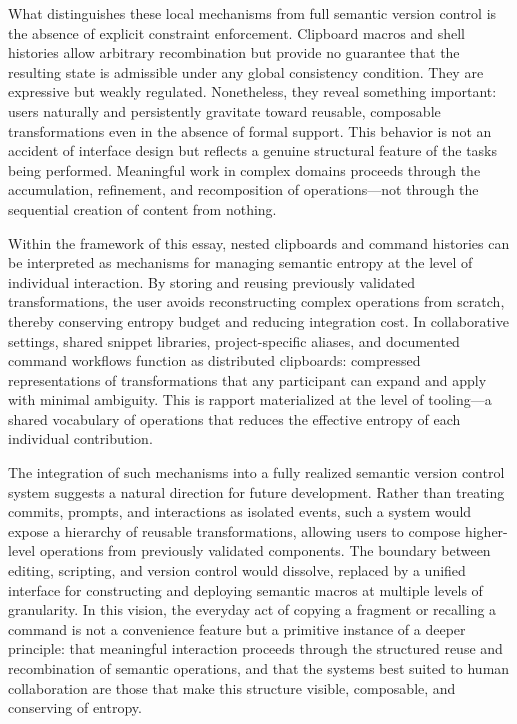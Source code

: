 \documentclass[12pt, letterpaper]{article}
\begin{document}
What distinguishes these local mechanisms from full semantic version control is the absence of explicit constraint enforcement. Clipboard macros and shell histories allow arbitrary recombination but provide no guarantee that the resulting state is admissible under any global consistency condition. They are expressive but weakly regulated. Nonetheless, they reveal something important: users naturally and persistently gravitate toward reusable, composable transformations even in the absence of formal support. This behavior is not an accident of interface design but reflects a genuine structural feature of the tasks being performed. Meaningful work in complex domains proceeds through the accumulation, refinement, and recomposition of operations---not through the sequential creation of content from nothing.

Within the framework of this essay, nested clipboards and command histories can be interpreted as mechanisms for managing semantic entropy at the level of individual interaction. By storing and reusing previously validated transformations, the user avoids reconstructing complex operations from scratch, thereby conserving entropy budget and reducing integration cost. In collaborative settings, shared snippet libraries, project-specific aliases, and documented command workflows function as distributed clipboards: compressed representations of transformations that any participant can expand and apply with minimal ambiguity. This is rapport materialized at the level of tooling---a shared vocabulary of operations that reduces the effective entropy of each individual contribution.

The integration of such mechanisms into a fully realized semantic version control system suggests a natural direction for future development. Rather than treating commits, prompts, and interactions as isolated events, such a system would expose a hierarchy of reusable transformations, allowing users to compose higher-level operations from previously validated components. The boundary between editing, scripting, and version control would dissolve, replaced by a unified interface for constructing and deploying semantic macros at multiple levels of granularity. In this vision, the everyday act of copying a fragment or recalling a command is not a convenience feature but a primitive instance of a deeper principle: that meaningful interaction proceeds through the structured reuse and recombination of semantic operations, and that the systems best suited to human collaboration are those that make this structure visible, composable, and conserving of entropy.
\end{document}
